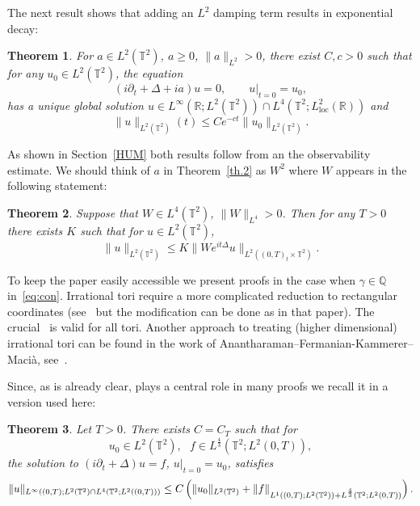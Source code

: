 \documentclass[11pt]{article}
\newtheorem{theo}{Theorem}[section]
\theoremstyle{definition}
\numberwithin{equation}{section}
\numberwithin{figure}{section}
\numberwithin{table}{section}
\newcommand{\R}{{\mathbb R}}
\newcommand{\TT}{{\mathbb T}}
\newcommand{\loc}{\mathrm{loc}}
\begin{document}
The next result shows that adding an $ L^2 $ damping term results in exponential decay:

\begin{theo}\label{th.3}
For $a\in L^2(\TT^2)$, $ a \geq 0 $, $ \| a \|_{L^2} > 0$, there exist $C, c>0$ such that for any $u_0 \in L^2(\TT^2)$, the equation
\begin{equation}\label{damped}
(i \partial_t + \Delta + ia) u=0, \qquad u |_{t=0} = u_0,
\end{equation}
has a unique global solution $ u \in L^\infty(\R; L^2(\TT^2))\cap L^4(\TT^2; L^2_{\loc}(\R)) $ and
\begin{equation}\label{dampedbis}
\| u\|_{L^2(\TT^2)} (t) \leq C e^{-ct} \| u_0 \|_{L^2(\TT^2)}.
\end{equation}
\end{theo}

As shown in Section~\ref{HUM} both results follow from an the observability estimate. We should think of $ a $ in Theorem~\ref{th.2} as $ W^2 $ where $ W $ appears in the following statement:

\begin{theo}\label{th.1}
Suppose that $ W \in L^4 (\TT^2) $, $ \| W \|_{L^4} >0 $. Then for any $ T > 0$ there exists $ K $ such that for $ u \in L^2 (\TT^2) $,
\begin{equation}\label{eq:th1}
\| u \|_{ L^2 (\TT^2) } \leq K \| W e^{ it \Delta} u \|_{ L^2 ((0,T)_t \times \TT^2) }.
\end{equation}
\end{theo}

To keep the paper easily accessible we present proofs in the case when $ \gamma \in \mathbb Q $ in~\eqref{eq:con}. Irrational tori require a more complicated reduction to rectangular coordinates (see~\cite[Lemma~2.7 and Figure~1]{BZ4} but the modification can be done as in that paper). The crucial~\cite[Proposition~2.2]{BBZ} is valid for all tori. Another approach to treating (higher dimensional) irrational tori can be found in the work of Anantharaman--Fermanian-Kammerer--Macià, see~\cite[Corollary~1.19, Theorem~1.20]{AFM}.

Since, as is already clear, \cite[Proposition~2.2]{BBZ} plays a central role in many proofs we recall it in a version used here:

\begin{theo}\label{th.BBZ}
Let $ T > 0 $. There exists $ C = C_T $ such that for
\[
u_0\in L^2(\TT^2), \ \ \ f \in L^{\frac 4 3 } (\TT^2 ; L^2(0, T)),
\]
the solution to $ (i \partial_t + \Delta) u =f$, $ u|_{t=0} = u_0$, satisfies
\[
\| u\|_{L^\infty ((0, T) ; L^2 (\TT^2) \cap L^4(\TT^2; L^2((0,T)))}\\
\leq C \left(\|u_0\|_{L^2(\TT^2)} + \|f\|_{ L^1 ((0,T) ; L^2 (\TT^2)) + L^{\frac 4 3 } (\TT^2 ; L^2(0, T))}\right).
\]
\end{theo}
\end{document}
